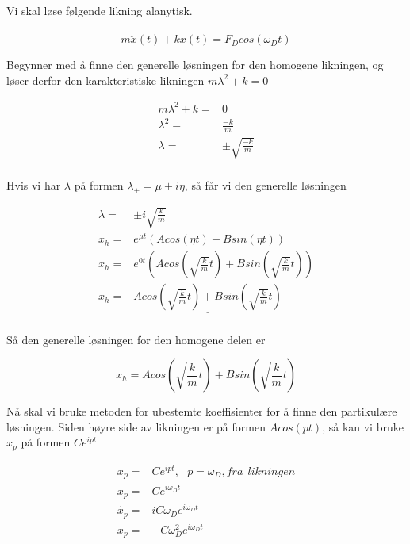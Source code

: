\documentclass[norsk,a4paper,12pt]{article}
\begin{document}
Vi skal løse følgende likning alanytisk.
\\
\\
\begin{equation}
	m \ddot{x}(t) +kx(t) = F_D cos(\omega_Dt)
	\label{eq:diffpatrykt}
\end{equation}

Begynner med å finne den generelle løsningen for den homogene likningen, og løser derfor den karakteristiske likningen $m\lambda^2 + k = 0$

\begin{align*}
	m\lambda^2 + k =& 0 \\
	\lambda^2 =& \frac{-k}{m} \\
	\lambda =& \pm \sqrt{\frac{-k}{m}}\\
\end{align*}

Hvis vi har $\lambda$ på formen $\lambda_{\pm} = \mu \pm i\eta$, så får vi den generelle løsningen

\begin{align*}
	\lambda =& \pm i \sqrt{\frac{k}{m}}\\
	x_h =& e^{\mu t}(A cos(\eta t) + B sin(\eta t))\\
	x_h =& e^{0t} \left(A cos \left(\sqrt{\frac{k}{m}}t\right) +B sin \left(\sqrt{\frac{k}{m}}t \right) \right)\\
	x_h =& \underline{A cos \left(\sqrt{\frac{k}{m}}t \right) +B sin \left(\sqrt{\frac{k}{m}}t \right)}\\
\end{align*}

Så den generelle løsningen for den homogene delen er

\begin{equation}
	x_h = A cos \left(\sqrt{\frac{k}{m}}t \right) +B sin \left(\sqrt{\frac{k}{m}}t \right)
\end{equation}


Nå skal vi bruke metoden for ubestemte koeffisienter for å finne den partikulære løsningen. Siden høyre side av likningen er på formen $A cos(pt)$, så kan vi bruke $x_p$ på formen $C e^{ipt}$

\begin{align*}
	x_p =& C e^{ipt},\   \   \ p=\omega_D, fra\ \ likningen\\
	x_p =& C e^{i\omega_Dt}\\
	\dot{x_p} =& iC\omega_D e^{i\omega_Dt}\\
	\ddot{x_p} =& -C\omega_D^2 e^{i\omega_Dt}\\
\end{align*}
\end{document}
